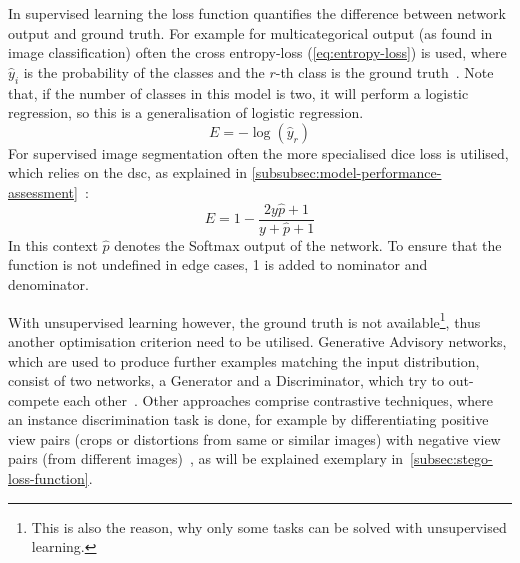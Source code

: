 In supervised learning the loss function quantifies the difference between network output and ground truth.
For example for multicategorical output (as found in image classification) often the cross entropy-loss (\autoref{eq:entropy-loss}) is used, where $\hat{y}_i$ is the probability of the classes and the $r$-th class is the ground truth~\autocite[Chapter~1.2.1]{Aggarwal2018}.
Note that, if the number of classes in this model is two, it will perform a logistic regression, so this is a generalisation of logistic regression.
\begin{equation}
    E = -\log(\hat{y}_r)
    \label{eq:entropy-loss}
\end{equation}
For supervised image segmentation often the more specialised dice loss is utilised, which relies on the \gls{dsc}, as explained in \autoref{subsubsec:model-performance-assessment}~\autocite{Jadon2020}:
\begin{equation}
    E = 1 - \frac{2y\hat{p}+ 1}{y + \hat{p} + 1}
    \label{eq:dice-loss}
\end{equation}
In this context $\hat{p}$ denotes the Softmax output of the network.
To ensure that the function is not undefined in edge cases, 1 is added to nominator and denominator.

With unsupervised learning however, the ground truth is not available\footnote{This is also the reason, why only some tasks can be solved with unsupervised learning.}, thus another optimisation criterion need to be utilised.
Generative Advisory networks, which are used to produce further examples matching the input distribution, consist of two networks, a Generator and a Discriminator, which try to out-compete each other~\autocite{Goodfellow2020}.
Other approaches comprise contrastive techniques, where an instance discrimination task is done, for example by differentiating positive view pairs (crops or distortions from same or similar images) with negative view pairs (from different images)~\autocite{Wang2021}, as will be explained exemplary in~\autoref{subsec:stego-loss-function}.

